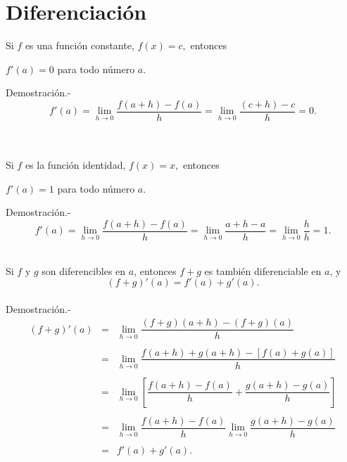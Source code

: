 \chapter{Diferenciación}

\begin{teo}
    Si $f$ es una función constante, $f(x)=c,$ entonces
    \begin{center}
	$f'(a)=0$ para todo número $a$.
    \end{center}
    \vspace{.5cm}
	Demostración.-\; $$f'(a)=\lim\limits_{h\to 0}\dfrac{f(a+h)-f(a)}{h}=\lim\limits_{h\to 0}\dfrac{(c+h)-c}{h}=0.$$\\\\
\end{teo}

\begin{teo}
    Si $f$ es la función identidad, $f(x)=x,$ entonces
    \begin{center}
	$f'(a)=1$ para todo número $a$.
    \end{center}
    \vspace{.5cm}
	Demostración.-\;
	$$f'(a)=\lim_{h\to 0}\dfrac{f(a+h)-f(a)}{h}=\lim\limits_{h\to 0}\dfrac{a+h-a}{h}=\lim_{h\to 0}\dfrac{h}{h}=1.$$\\
\end{teo}

\begin{teo}
    Si $f$ y $g$ son diferencibles en $a$, entonces $f+g$ es también diferenciable en $a$, y
    $$(f+g)'(a)=f'(a)+g'(a).$$\\
	Demostración.-\; 
	$$\begin{array}{rcl}
	    (f+g)'(a) &=& \lim\limits_{h\to 0} \dfrac{(f+g)(a+h)-(f+g)(a)}{h}\\\\
		      &=& \lim\limits_{h\to 0} \dfrac{f(a+h)+g(a+h)-\left[f(a)+g(a)\right]}{h}\\\\
		      &=& \lim\limits_{h\to 0} \left[\dfrac{f(a+h)-f(a)}{h}+\dfrac{g(a+h)-g(a)}{h}\right]\\\\
		      &=& \lim\limits_{h\to 0} \dfrac{f(a+h)-f(a)}{h} \lim\limits_{h\to 0}\dfrac{g(a+h)-g(a)}{h}\\\\
		      &=& f'(a)+g'(a).\\\\
	\end{array}$$
\end{teo}

